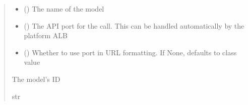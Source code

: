 \documentclass[letterpaper,10pt,english]{sphinxmanual}
\begin{document}
\begin{fulllineitems}
\begin{fulllineitems}
\begin{sphinxVerbatim}[commandchars=\\\{\}]
 
  
\end{sphinxVerbatim}
\begin{quote}\begin{description}
\begin{itemize}
\item {} 
\sphinxAtStartPar
{} () \textendash{} The name of the model

\item {} 
\sphinxAtStartPar
{} (\sphinxstyleliteralemphasis{\sphinxupquote{ (}}\sphinxstyleliteralemphasis{\sphinxupquote{)}}) \textendash{} The API port for the call. This can be handled automatically by the platform ALB

\item {} 
\sphinxAtStartPar
{} (\sphinxstyleliteralemphasis{\sphinxupquote{ (}}\sphinxstyleliteralemphasis{\sphinxupquote{)}}) \textendash{} Whether to use port in URL formatting. If None, defaults to class value

\end{itemize}

\sphinxAtStartPar
{} \textendash{} The model’s ID

\sphinxAtStartPar
str

\end{description}\end{quote}


\end{fulllineitems}
\end{fulllineitems}
\end{document}
